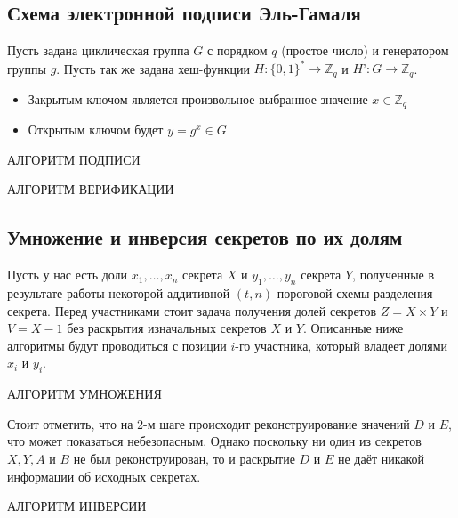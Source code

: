 \documentclass[a4paper,12pt]{article}
\theoremstyle{definition}
\begin{document}
		\subsection{Схема электронной подписи Эль-Гамаля} \label{applic:ElGam}
		
		Пусть задана циклическая группа $G$ с порядком $q$ (простое число) и генератором группы $g$. Пусть так же задана хеш-функции $H: \{0, 1\}^* \rightarrow \mathbb Z_q$ и $H’: G \rightarrow \mathbb Z_q$.
		
		\begin{itemize}
			\item Закрытым ключом является произвольное выбранное значение $x \in \mathbb Z_q$
			\item Открытым ключом будет $y=g^x \in G$
		\end{itemize}
	
		АЛГОРИТМ ПОДПИСИ
		
		АЛГОРИТМ ВЕРИФИКАЦИИ
		
		\subsection{Умножение и инверсия секретов по их долям} \label{applic:MultInv}
		
		Пусть у нас есть доли $x_1, \dots, x_n$ секрета $X$ и $y_1, \dots, y_n$ секрета $Y$, полученные в результате работы некоторой аддитивной $(t, n)$-пороговой схемы разделения секрета. Перед участниками стоит задача получения долей секретов $Z=X\times Y$ и $V=X-1$ без раскрытия изначальных секретов $X$ и $Y$. Описанные ниже алгоритмы будут проводиться с позиции $i$-го участника, который владеет долями $x_i$ и $y_i$.
		
		АЛГОРИТМ УМНОЖЕНИЯ
		
		Стоит отметить, что на 2-м шаге происходит реконструирование значений $D$ и $E$, что может показаться небезопасным. Однако поскольку ни один из секретов $X, Y, A$ и $B$ не был реконструирован, то и раскрытие $D$ и $E$ не даёт никакой информации об исходных секретах.
		
		АЛГОРИТМ ИНВЕРСИИ
	
	
\end{document}
